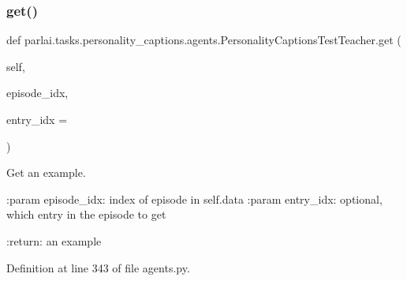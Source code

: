 \subsubsection{\texorpdfstring{get()}{get()}}
{\footnotesize\ttfamily def parlai.\+tasks.\+personality\+\_\+captions.\+agents.\+Personality\+Captions\+Test\+Teacher.\+get (\begin{DoxyParamCaption}\item[{}]{self,  }\item[{}]{episode\+\_\+idx,  }\item[{}]{entry\+\_\+idx = {} }\end{DoxyParamCaption})}

\begin{DoxyVerb}Get an example.

:param episode_idx:
    index of episode in self.data
:param entry_idx:
    optional, which entry in the episode to get

:return:
    an example
\end{DoxyVerb}
 

Definition at line 343 of file agents.\+py.


